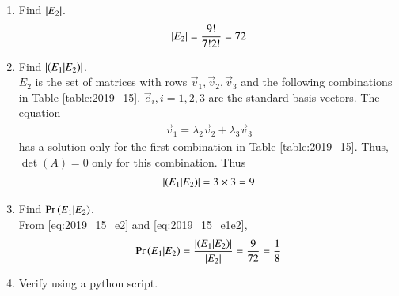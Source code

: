 \documentclass[journal,12pt,twocolumn]{IEEEtran}
\renewcommand\thesection{\arabic{section}}
\begin{document}
\begin{enumerate}[label=\thesection.\arabic*
,ref=\thesection.\theenumi]
\item Find $\left\vert E_2\right\vert$.
\\
\solution 
\begin{align}
\label{eq:2019_15_e2}
\left\vert E_2\right\vert= \frac{9!}{7!2!} = 72
\end{align}

\item Find $\left\vert\left(E_1|E_2\right)\right\vert$.
\\
\solution $E_2$ is the set of matrices with rows $\vec{v}_1,\vec{v}_2,\vec{v}_3$ and the following combinations in Table \ref{table:2019_15}. $\vec{e}_i, i = 1,2,3$ are the standard basis vectors. The equation 
\begin{align}
\vec{v}_1 =\lambda_2\vec{v}_2+\lambda_3\vec{v}_3
\end{align}
has a solution only for the first combination in Table \ref{table:2019_15}. Thus, $\det(A) = 0$ only for this combination.  Thus
\begin{align}
\label{eq:2019_15_e1e2}
\left\vert\left(E_1|E_2\right)\right\vert = 3\times 3 = 9
\end{align}
\begin{table}[!h]
\centering
%

\caption{}
\label{table:2019_15}
\end{table}
\item Find $\Pr\left(E_1|E_2\right)$.
\\
\solution From \eqref{eq:2019_15_e2} and \eqref{eq:2019_15_e1e2}, 
\begin{align}
\label{eq:2019_15_sol}
\Pr\left(E_1|E_2\right) = \frac{\left\vert\left(E_1|E_2\right)\right\vert}{\left\vert E_2\right\vert} = \frac{9}{72} = \frac{1}{8}
\end{align}
\item Verify using a python script.
\end{enumerate}
\end{document}
